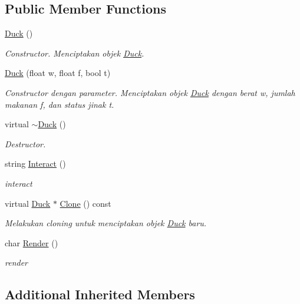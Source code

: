 \subsection*{Public Member Functions}
\begin{DoxyCompactItemize}
\item 
\hyperlink{classDuck_a65753b7b6eb80c4639f6bf165b8db9a6}{Duck} ()
\begin{DoxyCompactList}\small\item\em Constructor. Menciptakan objek \hyperlink{classDuck}{Duck}. \end{DoxyCompactList}\item 
\hyperlink{classDuck_ac66ea5a4f3b6555e818ff743005f1c38}{Duck} (float w, float f, bool t)
\begin{DoxyCompactList}\small\item\em Constructor dengan parameter. Menciptakan objek \hyperlink{classDuck}{Duck} dengan berat w, jumlah makanan f, dan status jinak t. \end{DoxyCompactList}\item 
virtual \hyperlink{classDuck_a073eb979ff45a938fde4cf769f5e579b}{$\sim$\+Duck} ()
\begin{DoxyCompactList}\small\item\em Destructor. \end{DoxyCompactList}\item 
string \hyperlink{classDuck_a9355aa821755703c02ac96e49692eaea}{Interact} ()
\begin{DoxyCompactList}\small\item\em interact \end{DoxyCompactList}\item 
virtual \hyperlink{classDuck}{Duck} $\ast$ \hyperlink{classDuck_ae3ff98b443c887f37ce63e3ed2e3a690}{Clone} () const 
\begin{DoxyCompactList}\small\item\em Melakukan cloning untuk menciptakan objek \hyperlink{classDuck}{Duck} baru. \end{DoxyCompactList}\item 
char \hyperlink{classDuck_a8453f95adcf2e7ff1b35a1a9d9948510}{Render} ()
\begin{DoxyCompactList}\small\item\em render \end{DoxyCompactList}\end{DoxyCompactItemize}
\subsection*{Additional Inherited Members}


